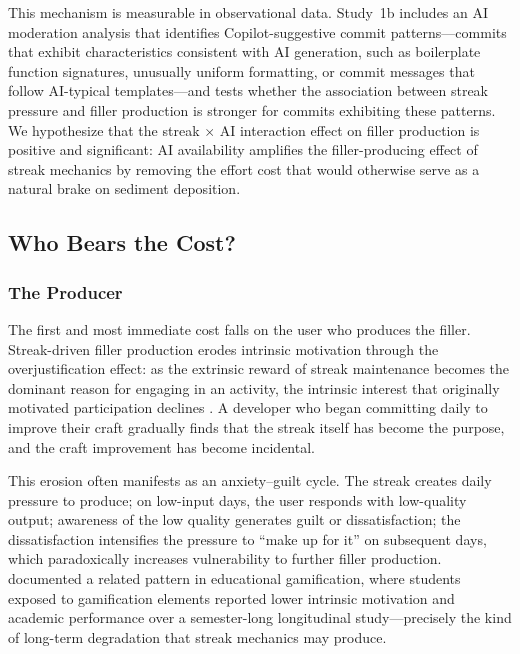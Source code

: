 \documentclass[12pt]{article}
\begin{document}
This mechanism is measurable in observational data. Study~1b includes an AI moderation analysis that identifies Copilot-suggestive commit patterns---commits that exhibit characteristics consistent with AI generation, such as boilerplate function signatures, unusually uniform formatting, or commit messages that follow AI-typical templates---and tests whether the association between streak pressure and filler production is stronger for commits exhibiting these patterns. We hypothesize that the streak $\times$ AI interaction effect on filler production is positive and significant: AI availability amplifies the filler-producing effect of streak mechanics by removing the effort cost that would otherwise serve as a natural brake on sediment deposition.

\subsection{Who Bears the Cost?}
\label{sec:who-bears-cost}

\subsubsection{The Producer}
\label{sec:cost-producer}

The first and most immediate cost falls on the user who produces the filler. Streak-driven filler production erodes intrinsic motivation through the overjustification effect: as the extrinsic reward of streak maintenance becomes the dominant reason for engaging in an activity, the intrinsic interest that originally motivated participation declines \citep{Deci1999}. A developer who began committing daily to improve their craft gradually finds that the streak itself has become the purpose, and the craft improvement has become incidental.

This erosion often manifests as an anxiety--guilt cycle. The streak creates daily pressure to produce; on low-input days, the user responds with low-quality output; awareness of the low quality generates guilt or dissatisfaction; the dissatisfaction intensifies the pressure to ``make up for it'' on subsequent days, which paradoxically increases vulnerability to further filler production. \citet{Hanus2015} documented a related pattern in educational gamification, where students exposed to gamification elements reported lower intrinsic motivation and academic performance over a semester-long longitudinal study---precisely the kind of long-term degradation that streak mechanics may produce.
\end{document}
